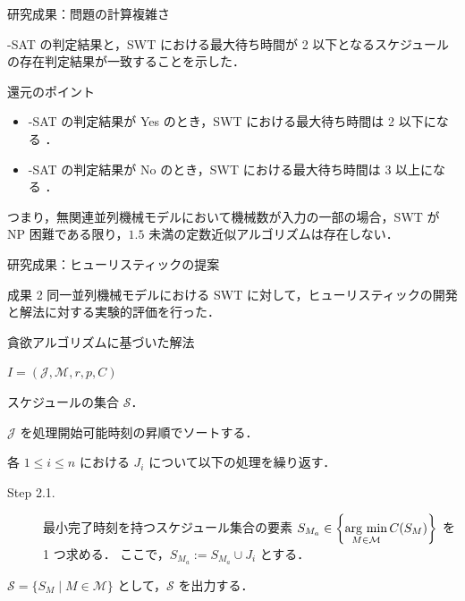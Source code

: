 \documentclass[dvipdfmx]{beamer}
\newcommand{\argmin}{\mathop{\rm arg~min}\limits}
\begin{document}
    \begin{frame}{研究成果：問題の計算複雑さ}

      {-SAT} の判定結果と，SWT における最大待ち時間が \alert{2 以下}となるスケジュールの存在判定結果が一致することを示した．

      \begin{block}{還元のポイント}
        \begin{itemize}
          \item {-SAT} の判定結果が \alert{Yes} のとき，SWT における最大待ち時間は \alert{2 以下}になる ．
          \item {-SAT} の判定結果が \alert{No} のとき，SWT における最大待ち時間は \alert{3 以上}になる ．
        \end{itemize}
      \end{block}
      つまり，無関連並列機械モデルにおいて機械数が入力の一部の場合，SWT が NP 困難である限り，$1.5$ 未満の定数近似アルゴリズムは存在しない．
    \end{frame}

    \begin{frame}{研究成果：ヒューリスティックの提案}
      \begin{alertblock}{成果 2}
        同一並列機械モデルにおける SWT に対して，ヒューリスティックの開発と解法に対する実験的評価を行った．
      \end{alertblock}
      \begin{block}{貪欲アルゴリズムに基づいた解法}
        \begin{description}
          \setlength{\leftskip}{-10mm}
          \item[入力 :] $I = (\mathcal{J}, \mathcal{M},r,p,C)$
          \item[出力 :] スケジュールの集合 $\mathcal{S}$．
          \begin{description}
            \setlength{\leftskip}{-25mm}
            \item[Step 1.]
            $\mathcal{J}$ を処理開始可能時刻の昇順でソートする．
            \item[Step 2.]
            各 $1 \le i \le n$ における $J_i$ について以下の処理を繰り返す．
            \begin{description}
              \item[Step 2.1.]
              \setlength{\leftskip}{-40mm}
              最小完了時刻を持つスケジュール集合の要素 $S_{M_a} \in \left\{ \displaystyle \argmin_{M \in \mathcal{M}}C(S_M)\right\}$ を 1 つ求める．
              ここで，$S_{M_a} := S_{M_a} \cup J_i$ とする．
            \end{description}
            \item[Step 3.]
            $\mathcal{S} = \{ S_M \mid M \in \mathcal{M}\}$ として，$\mathcal{S}$ を出力する．
          \end{description}
        \end{description}
      \end{block}
    \end{frame}
\end{document}
